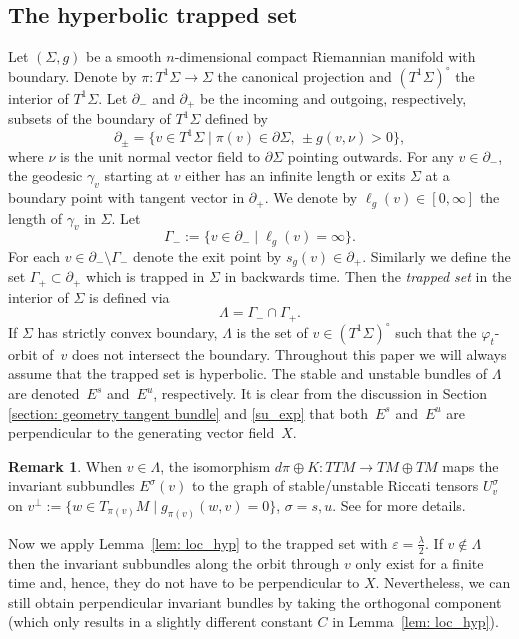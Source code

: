 \documentclass[JEP,XML,SOM,Unicode,NoFloatCountersInSection]{cedram}
\let\sep\mid
\newcommand{\elg}{\ell_g}
\theoremstyle{definition}
\newtheorem{remark}[theorem]{Remark}
\let\phi\varphi
\let\eps\varepsilon
\renewcommand{\>}{{\rangle}}
\newcommand{\<}{{\langle}}
\begin{document}
\subsection{The hyperbolic trapped set}\label{prel: hyp_trapped_sets}
Let $(\Sigma,g)$ be a smooth $n$-dimensional compact Riemannian manifold with boundary. Denote by $\pi: T^1{\Sigma}\to \Sigma$ the canonical projection and
$\left(T^1\Sigma\right)^\circ$ the interior of $T^1\Sigma$. Let $\partial_{-}$ and $\partial_{+}$ be the incoming and outgoing, respectively, subsets of the boundary of $T^1\Sigma$ defined by
\[
\partial_{\pm} =\{v\in T^1\Sigma\sep \pi(v)\in\partial\Sigma, \, \pm g(v,\nu)>0\},
\]
where $\nu$ is the unit normal vector field to $\partial\Sigma$ pointing outwards. For any $v\in \partial_-$, the geodesic $\gamma_v$ starting at $v$ either has an infinite length or exits $\Sigma$ at a boundary point with tangent vector
in $\partial_+$. We denote by $\elg(v)\in [0,\infty]$ the length of $\gamma_{v}$ in $\Sigma$. Let
\[
\Gamma_{-}:=\{v\in \partial_{-}\sep \elg(v)=\infty\}.
\]
For each $v\in\partial_-\setminus \Gamma_-$ denote the exit point by $s_g(v)\in\partial_+$. Similarly we define the set $\Gamma_+\subset\partial_+$ which is trapped in $\Sigma$ in backwards time. Then the {\it trapped set} in the interior of $\Sigma$ is defined via
\[
\Lambda=\Gamma_-\cap \Gamma_+.
\]
If $\Sigma$ has strictly convex boundary, $\Lambda$ is the set of $v\in (T^1\Sigma)^\circ$ such that the $\phi_t$-orbit of~$v$ does not intersect the boundary. Throughout this paper we will always assume that the trapped set is hyperbolic. The stable and unstable bundles of $\Lambda$ are denoted~$E^s$ and~$E^u$, respectively. It is clear from
the discussion in Section \ref{section: geometry tangent bundle} and \eqref{su_exp} that both~$E^s$ and~$E^u$ are perpendicular to the generating vector field~$X$.

\begin{remark}\label{rem: U+-}
When $v\in\Lambda$, the isomorphism $d\pi\oplus K: TTM\to TM\oplus TM$ maps the invariant subbundles $E^{\sigma}(v)$ to the graph of stable/unstable Riccati
tensors $U^{\sigma}_v$ on $v^{\bot} := \{w\in T_{\pi(v)}M\sep g_{\pi(v)}(w,v)=0\}$, $\sigma=s,u$. See \cite{E73} for more details.
\end{remark}

Now we apply Lemma~\ref{lem: loc_hyp} to the trapped set with $\eps=\frac{\lambda}{2}$. If $v\notin\Lambda$ then the invariant subbundles along the orbit through $v$ only exist for a finite time and, hence,
they do not have to be perpendicular to $X$. Nevertheless, we can still
obtain perpendicular invariant bundles by taking the orthogonal component (which only results in a slightly different constant $C$ in Lemma~\ref{lem: loc_hyp}).
\end{document}
